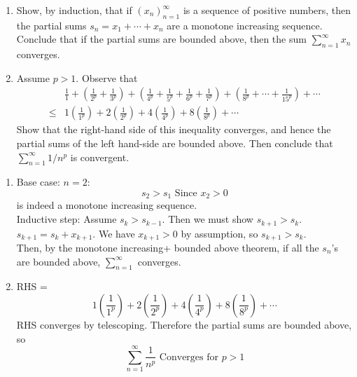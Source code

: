\documentclass[hidelinks,12pt]{article}
\renewcommand{\leq}{\leqslant}
\begin{document}
\begin{enumerate}
  \begin{enumerate}
    \item Show, by induction, that if $\left(x_n\right)_{n=1}^{\infty}$ is a sequence of positive numbers, then the partial sums $s_n=x_1+\cdots+x_n$ are a monotone increasing sequence. Conclude that if the partial sums are bounded above, then the sum $\sum_{n=1}^{\infty} x_n$ converges.
    \item Assume $p>1$. Observe that\[
\begin{aligned}
&\frac{1}{1}+\left(\frac{1}{2^p}+\frac{1}{3^p}\right)+\left(\frac{1}{4^p}+\frac{1}{5^p}+\frac{1}{6^p}+\right. \left.\frac{1}{7^p}\right)+\left(\frac{1}{8^p}+\cdots+\frac{1}{15^p}\right)+\cdots \\
  \leq &1\left(\frac{1}{1^p}\right)+2\left(\frac{1}{2^p}\right)+4\left(\frac{1}{4^p}\right)+8\left(\frac{1}{8^p}\right)+\cdots
\end{aligned}\]
Show that the right-hand side of this inequality converges, and hence the partial sums of the left hand-side are bounded above. Then conclude that $\sum_{n=1}^{\infty} 1 / n^p$ is convergent.
  \end{enumerate}
  \begin{enumerate}
    \item Base case: $n=2$:\[s_2>s_1\text{ Since }x_2>0\] is indeed a monotone increasing sequence.\\
      Inductive step: Assume $s_k>s_{k-1}$. Then we must show $s_{k+1}>s_k$.$s_{k+1}=s_k+x_{k+1}$. We have $x_{k+1}>0$ by assumption, so $s_{k+1}>s_k$.\\
      Then, by the monotone increasing+ bounded above theorem, if all the $s_n$'s are bounded above, $\sum_{n=1}^{\infty}$ converges. 
    \item RHS = \[1\left(\frac{1}{1^p}\right)+2\left(\frac{1}{2^p}\right)+4\left(\frac{1}{4^p}\right)+8\left(\frac{1}{8^p}\right)+\cdots\]
      RHS converges by telescoping. Therefore the partial sums are bounded above, so \[\sum_{n=1}^{\infty}\frac{1}{n^p}\text{ Converges for }p>1\]
  \end{enumerate}
\end{enumerate}
\end{document}
